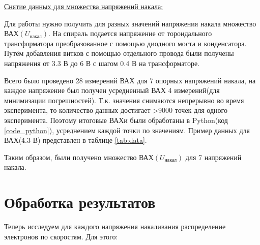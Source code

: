 \underline{Снятие данных для множества напряжений накала:}

Для работы нужно получить для разных значений напряжения накала множество $\text{ВАХ}(U_{\text{накал}})$. На спираль подается напряжение от тороидального трансформатора преобразованное с 
помощью диодного моста и конденсатора. Путём добавления витков с помощью отдельного провода были получены напряжения от 3.3 В до 6 В с шагом 0.4 В на трансформаторе. 

Всего было проведено 28 измерений ВАХ для 7 опорных напряжений накала, на каждое напряжение был получен усредненный ВАХ 4 измерений(для минимизации погрешностей). Т.к. значения снимаются непрерывно во время эксперимента, то количество данных достигает >9000 точек для одного эксперимента. Поэтому итоговые ВАХи были обработаны в Python(код \ref{code_python}), усреднением каждой точки по значениям. Пример данных для ВАХ(4.3 В) представлен в таблице \ref{tab:data}.

Таким образом, были получено множество $\text{ВАХ}(U_{\text{накал}})$ для 7 напряжений накала.
 
\newpage
\section{Обработка результатов}

\par 
Теперь исследуем для каждого напряжения накаливания распределение электронов по скоростям. Для этого:

